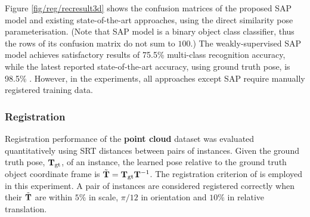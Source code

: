 Figure \ref{fig/reg/recresult3d} shows the confusion matrices of the proposed SAP model and existing state-of-the-art approaches, using the direct similarity pose parameterisation. (Note that SAP model is a binary object class classifier, thus the rows of its confusion matrix do not sum to $100$.)
The weakly-supervised SAP model achieves satisfactory results of 75.5\% multi-class recognition accuracy, while the latest reported state-of-the-art accuracy, using ground truth pose, is 98.5\% \cite{Woodford2013}. However, in the experiments, all approaches except SAP require manually registered training data.    

\subsubsection{Registration} 
\label{sec/reg/reg}
Registration performance of the \textbf{point cloud} dataset was evaluated quantitatively using SRT distances \cite{Pham2011} between pairs of instances. Given the ground truth pose, $\mathbf{T}_\mathrm{gt}$, of an instance, the learned pose relative to the ground truth object coordinate frame is $\tilde{\mathbf{T}} = \mathbf{T}_\mathrm{gt}\mathbf{T}^{-1}$.  
The registration criterion of \cite{Pham2011} is employed in this experiment. A pair of instances are considered registered correctly when their $\tilde{\mathbf{T}}$ are within $5\%$ in scale, $\pi/12$ in orientation and $10\%$ in relative translation.

